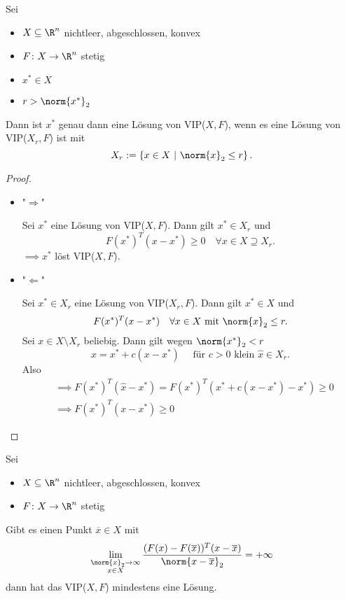 \begin{lemma}
	Sei
	\begin{itemize}
		\item $X \subseteq \R^{n}$ nichtleer, abgeschlossen, konvex
		\item $F \colon X \rightarrow \R^{n} $ stetig
		\item ${x}^{*} \in X$
		\item $r > \norm{{x}^{*}} _{2}$
	\end{itemize}
	Dann ist ${x}^{*}$ genau dann eine Lösung von VIP($X,F$), wenn es eine Lösung von VIP($X_{r},F$) ist mit
	\[
	X_{r}:= \left\{ x \in X ~|~ \norm{x} _{2}\leq  r \right\} 
	.\] 
\end{lemma}

\begin{proof}
	\begin{itemize}
		\item "$\Longrightarrow$"
	
			Sei ${x}^{*}$ eine Lösung von VIP($X,F$). Dann gilt ${x}^{*} \in X_{r}$ und
			\[
				F({x}^{*})^{T}(x-{x}^{*}) \geq  0 \quad \forall x \in X \supseteq X_{r}
			.\] 
			$\implies {x}^{*}$ löst VIP($X,F$).
	
		\item "$\Longleftarrow$"
	
			Sei ${x}^{*} \in X_{r}$ eine Lösung von VIP($X_{r},F$). Dann gilt ${x}^{*} \in X$ und
			\[
				F({x}^{*})^{T}(x-{x}^{*}) \quad \forall x \in X \text{ mit } \norm{x}_{2}  \leq  r
			.\] 
			Sei $x \in X \setminus  X_{r}$ beliebig. Dann gilt wegen $\norm{{x}^{*}}_{2}< r$
			\[
				\hat{x} = {x}^{*} + c(x-{x}^{*}) \quad \text{ für }c>0 \text{ klein } \hat{x} \in X_{r}
			.\] 
			Also
			\begin{align*}
				&\implies F({x}^{*})^{T}(\hat{x}-{x}^{*}) = F({x}^{*})^{T}({x}^{*} + c (x-{x}^{*}) - {x}^{*}) \geq  0 \\
				&\implies F({x}^{*})^{T}(x-{x}^{*}) \geq  0
			\end{align*}
			
	\end{itemize}
	
\end{proof}

\begin{satz}
	Sei
	\begin{itemize}
		\item $X \subseteq \R^{n}$ nichtleer, abgeschlossen, konvex
		\item $F \colon X \rightarrow \R^{n} $ stetig
	\end{itemize}
	Gibt es einen Punkt $\overline{x} \in X$ mit
	\[
		\lim_{\substack{\norm{x}_{2} \rightarrow \infty \\ x \in X}} \frac{(F(x) - F(\overline{x}))^{T}(x-\overline{x})}{\norm{x-\overline{x}}_{2} } = + \infty
	\] 
	dann hat das VIP($X,F$) mindestens eine Lösung.
\end{satz}

